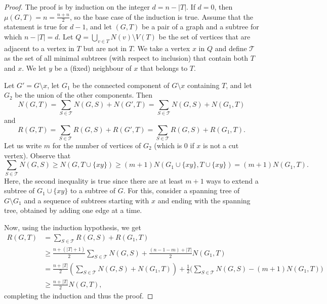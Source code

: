 \documentclass[10pt,a4paper]{amsart}
\newcommand*{\abs}[1]{\lvert #1\rvert}
\begin{document}
\begin{proof} 
The proof is by induction on the integer $d = n- \abs{T}$. If $d=0$, then $\mu(G,T)=n=\frac{n+n}{2}$, so the base case of the induction is true. 
Assume that the statement is true for $d-1$, and let $(G,T)$ be a pair of a graph and a subtree for which $n-\abs T = d$. 
Let $Q= \bigcup_{v \in T} N(v) \setminus V(T)$ be the set of vertices that are adjacent to a vertex in $T$ but are not in $T$. 
We take a vertex $x$ in $Q$ and define $\mathcal T$ as the set of all minimal subtrees (with respect to inclusion) that contain both $T$ and $x.$ We let $y$ be a (fixed) neighbour of $x$ that belongs to $T$.
 

Let $G' = G \setminus x$, let $G_1$ be the connected component of $G \setminus x$ containing $T$, and let $G_2$ be the union of the other components. Then
\[N(G,T)= \sum_{S \in \mathcal T}  N(G, S )+ N(G',T) =\sum_{S \in \mathcal T} N(G, S ) + N(G_1,T)\]
and
\[R(G,T)= \sum_{S \in \mathcal T}  R(G, S )+ R(G',T) =\sum_{S \in \mathcal T} R(G, S ) + R(G_1,T).\]
Let us write $m$ for the number of vertices of $G_2$ %
(which is $0$ if $x$ is not a cut vertex). Observe that
$$\sum_{S \in \mathcal T} N(G, S ) \ge N(G, T \cup \{xy\}) \ge (m+1) N(G_1\cup \{xy\}, T \cup \{xy\}) = (m+1) N(G_1, T).$$
Here, the second inequality is true since there are at least $m+1$ ways to extend a subtree of $G_1\cup \{xy\}$ to a subtree of $G$.
For this, consider a spanning tree of $G \setminus G_1$ and a sequence of subtrees starting with $x$ and ending with the spanning tree, obtained by adding one edge at a time.


Now, using the induction hypothesis, we get
\begin{align*} R(G,T) &= \sum_{S \in \mathcal T} R(G, S ) + R(G_1,T)\\
&\ge \frac{n+(\abs{T}+1)}{2} \sum_{S \in \mathcal T} N(G, S ) + \frac{(n-1-m)+\abs T}{2} N(G_1,T) \\&=
\frac{n+\abs{T}}{2} \left( \sum_{S \in \mathcal T} N(G, S ) + N(G_1,T)  \right ) + \frac{1}{2} \Big (\sum_{S \in \mathcal T} N(G, S )- (m+1) N(G_1, T) \Big ) \\ & \ge \frac{n+\abs{T}}{2} N(G, T),
\end{align*}
completing the induction and thus the proof.
\end{proof} 
\end{document}

